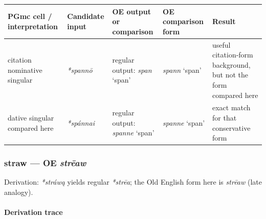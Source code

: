 \documentclass[
  british,
  a4paper,
]{article}
\newcounter{none} %
\providecommand{\Recon}[1]{\emph{*#1}}
\begin{document}
{\def\LTcaptype{none} %
\begin{longtable}[]{@{}
  >{\raggedright\arraybackslash}p{}
  >{\raggedright\arraybackslash}p{}
  >{\raggedright\arraybackslash}p{}
  >{\raggedright\arraybackslash}p{}
  >{\raggedright\arraybackslash}p{}@{}}
\toprule\noalign{}
\begin{minipage}[b]{\linewidth}\raggedright
PGmc cell / interpretation
\end{minipage} & \begin{minipage}[b]{\linewidth}\raggedright
Candidate input
\end{minipage} & \begin{minipage}[b]{\linewidth}\raggedright
OE output or comparison
\end{minipage} & \begin{minipage}[b]{\linewidth}\raggedright
OE comparison form
\end{minipage} & \begin{minipage}[b]{\linewidth}\raggedright
Result
\end{minipage} \\
\midrule\noalign{}
\endhead
\bottomrule\noalign{}
\endlastfoot
citation nominative singular & {\emph{*spannō}} & regular output:
{\emph{span}} `span' & {\emph{spann}} `span' & useful citation-form
background, but not the form compared here \\
dative singular compared here & {\emph{*spánnai}} & regular output:
{\emph{spanne}} `span' & {\emph{spanne}} `span' & exact match for that
conservative form \\
\end{longtable}
}

\subsubsection{\texorpdfstring{straw --- OE
\emph{strēaw}}{straw --- OE strēaw}}\label{straw-oe-strux113aw}

Derivation: \emph{*stráwą} yields regular \Recon{strēa}; the Old English
form here is \emph{strēaw} (late analogy).

\paragraph{Derivation trace}\label{derivation-trace-172}
\end{document}
